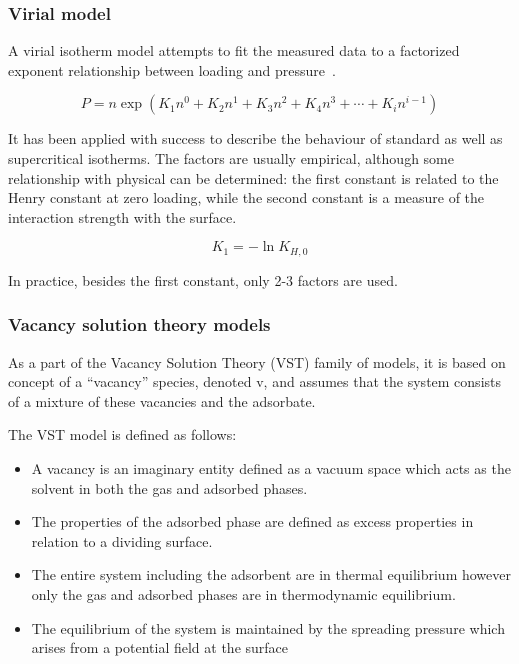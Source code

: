 \subsubsection{Virial model}

A virial isotherm model attempts to fit the measured data to a factorized
exponent relationship between loading and 
pressure~\cite{myersThermodynamicsAdsorptionPorous2002}.

\begin{equation}
    P = n \exp{(K_1n^0 + K_2n^1 + K_3n^2 + K_4n^3 + \cdots + K_i n^{i-1})}
\end{equation}

It has been applied with success to describe the behaviour of standard as
well as supercritical isotherms. The factors are usually empirical,
although some relationship with physical can be determined:
the first constant is related to the Henry constant at zero loading, while
the second constant is a measure of the interaction strength with the surface.

\begin{equation}
    K_1 = -\ln{K_{H,0}}
\end{equation}

In practice, besides the first constant, only 2-3 factors are used.


\subsubsection{Vacancy solution theory models}


As a part of the Vacancy Solution Theory (VST) family of models, it is based on concept
of a “vacancy” species, denoted v, and assumes that the system consists of a
mixture of these vacancies and the adsorbate.

The VST model is defined as follows:

\begin{itemize}
    
    \item A vacancy is an imaginary entity defined as a vacuum space
    which acts as the solvent in both the gas and adsorbed phases.
    \item The properties of the adsorbed phase are defined as excess properties
    in relation to a dividing surface.
    \item The entire system including the adsorbent are in thermal equilibrium
    however only the gas and adsorbed phases are in thermodynamic equilibrium.
    \item The equilibrium of the system is maintained by the spreading pressure
    which arises from a potential field at the surface

\end{itemize}
    
